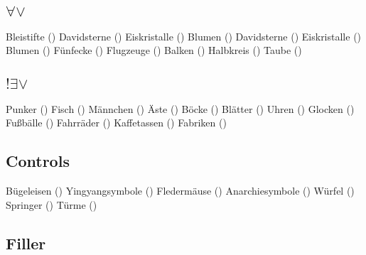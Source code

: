 \documentclass[fleqn,reqno,10pt]{article}
\begin{document}
\subsection{$\forall\vee$}

\begin{exe}
\ex
  \begin{xlist}
    \ex Bleistifte ()
    \ex Davidsterne (\davidsstar)
    \ex Eiskristalle ()
    \ex Blumen ()
    \ex Davidsterne (\davidsstar)
    \ex Eiskristalle ()
    \ex Blumen ()
    \ex Fünfecke (\pentagon)
    \ex Flugzeuge ()
    \ex Balken ()
    \ex Halbkreis ()
    \ex Taube (\PHdove)
  \end{xlist}
\end{exe}

\subsection{$!\exists\vee$}

\begin{exe}
\ex
  \begin{xlist}
  \ex Punker (\PHplumedHead)
  \ex Fisch (\PHtunny)
  \ex Männchen (\PHchild)
  \ex Äste (\PHplaneTree)
  \ex Böcke (\PHram)
  \ex Blätter (\textleaf)
  \ex Uhren (\clock)
  \ex Glocken (\bell)
  \ex Fußbälle (\Football)
  \ex Fahrräder (\Bicycle)
  \ex Kaffetassen (\Coffeecup)
  \ex Fabriken (\Industry)
  \end{xlist}
\end{exe}

\subsection{Controls}

\begin{exe}
\ex
  \begin{xlist}
  \ex Bügeleisen (\IroningIII)
  \ex Yingyangsymbole (\Yinyang)
  \ex Fledermäuse (\Bat)
  \ex Anarchiesymbole (\CircledA)
  \ex Würfel ()
  \ex Springer (\symknight)
  \ex Türme (\symrook)
  \end{xlist}
\end{exe}




\subsection{Filler}






\end{document}
